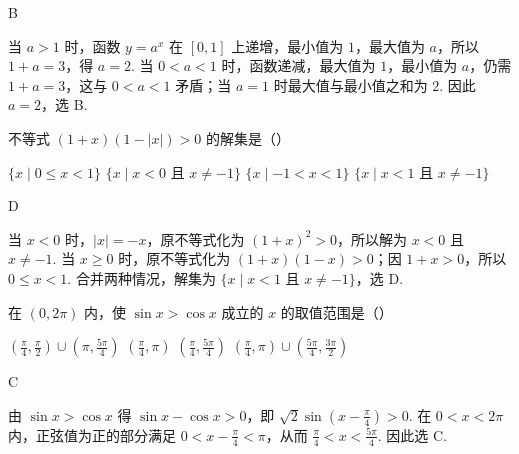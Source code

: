 \begin{answer}
B
\end{answer}

\begin{solution}
当 \(a>1\) 时，函数 \(y=a^x\) 在 \([0,1]\) 上递增，最小值为 \(1\)，最大值为 \(a\)，所以 \(1+a=3\)，得 \(a=2\). 当 \(0<a<1\) 时，函数递减，最大值为 \(1\)，最小值为 \(a\)，仍需 \(1+a=3\)，这与 \(0<a<1\) 矛盾；当 \(a=1\) 时最大值与最小值之和为 \(2\). 因此 \(a=2\)，选 B.
\end{solution}

\begin{problem}
不等式 \((1 + x)(1 - |x|) > 0\) 的解集是（\quad）

\choices
    {\(\{x\mid 0\leqslant x < 1\}\)}
    {\(\{x\mid x < 0 \text{ 且 } x\neq -1\}\)}
    {\(\{x\mid -1 < x < 1\}\)}
    {\(\{x\mid x < 1 \text{ 且 } x\neq -1\}\)}
\end{problem}

\begin{answer}
D
\end{answer}

\begin{solution}
当 \(x<0\) 时，\(|x|=-x\)，原不等式化为 \((1+x)^2>0\)，所以解为 \(x<0\) 且 \(x\neq-1\). 当 \(x\geqslant0\) 时，原不等式化为 \((1+x)(1-x)>0\)；因 \(1+x>0\)，所以 \(0\leqslant x<1\). 合并两种情况，解集为 \(\{x\mid x<1\text{ 且 }x\neq-1\}\)，选 D.
\end{solution}

\begin{problem}
在 \((0,2\pi)\) 内，使 \(\sin x > \cos x\) 成立的 \(x\) 的取值范围是（\quad）

\choices
    {\(\left(\frac{\pi}{4},\frac{\pi}{2}\right)\cup \left(\pi ,\frac{5\pi}{4}\right)\)}
    {\(\left(\frac{\pi}{4},\pi\right)\)}
    {\(\left(\frac{\pi}{4},\frac{5\pi}{4}\right)\)}
    {\(\left(\frac{\pi}{4},\pi\right)\cup \left(\frac{5\pi}{4},\frac{3\pi}{2}\right)\)}
\end{problem}

\begin{answer}
C
\end{answer}

\begin{solution}
由 \(\sin x>\cos x\) 得 \(\sin x-\cos x>0\)，即 \(\sqrt{2}\sin\left(x-\frac{\pi}{4}\right)>0\). 在 \(0<x<2\pi\) 内，正弦值为正的部分满足 \(0<x-\frac{\pi}{4}<\pi\)，从而 \(\frac{\pi}{4}<x<\frac{5\pi}{4}\). 因此选 C.
\end{solution}

